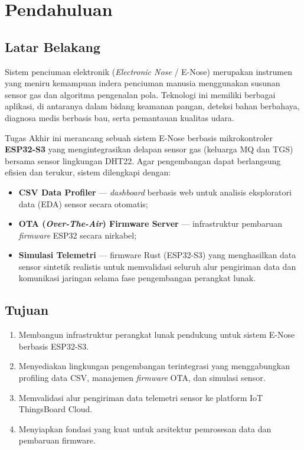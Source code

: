 \documentclass[12pt,a4paper]{report}
\begin{document}
\chapter{Pendahuluan}

\section{Latar Belakang}

Sistem penciuman elektronik (\textit{Electronic Nose} / E-Nose) merupakan instrumen
yang meniru kemampuan indera penciuman manusia menggunakan susunan sensor gas dan
algoritma pengenalan pola. Teknologi ini memiliki berbagai aplikasi, di antaranya
dalam bidang keamanan pangan, deteksi bahan berbahaya, diagnosa medis berbasis bau,
serta pemantauan kualitas udara.

Tugas Akhir ini merancang sebuah sistem E-Nose berbasis mikrokontroler
\textbf{ESP32-S3} yang mengintegrasikan delapan sensor gas (keluarga MQ dan TGS)
bersama sensor lingkungan DHT22. Agar pengembangan dapat berlangsung efisien dan
terukur, sistem dilengkapi dengan:

\begin{itemize}[leftmargin=2cm, itemsep=2pt]
  \item \textbf{CSV Data Profiler} --- \textit{dashboard} berbasis web untuk
        analisis eksploratori data (EDA) sensor secara otomatis;
  \item \textbf{OTA (\textit{Over-The-Air}) Firmware Server} --- infrastruktur
        pembaruan \textit{firmware} ESP32 secara nirkabel;
  \item \textbf{Simulasi Telemetri} --- firmware Rust (ESP32-S3) yang menghasilkan data
        sensor sintetik realistis untuk memvalidasi seluruh alur pengiriman data
        dan komunikasi jaringan selama fase pengembangan perangkat lunak.
\end{itemize}

\section{Tujuan}

\begin{enumerate}[leftmargin=2cm, itemsep=2pt]
  \item Membangun infrastruktur perangkat lunak pendukung untuk sistem E-Nose
        berbasis ESP32-S3.
  \item Menyediakan lingkungan pengembangan terintegrasi yang menggabungkan
        profiling data CSV, manajemen \textit{firmware} OTA, dan simulasi sensor.
  \item Memvalidasi alur pengiriman data telemetri sensor ke platform IoT
        ThingsBoard Cloud.
  \item Menyiapkan fondasi yang kuat untuk arsitektur pemrosesan data dan pembaruan firmware.
\end{enumerate}
\end{document}
